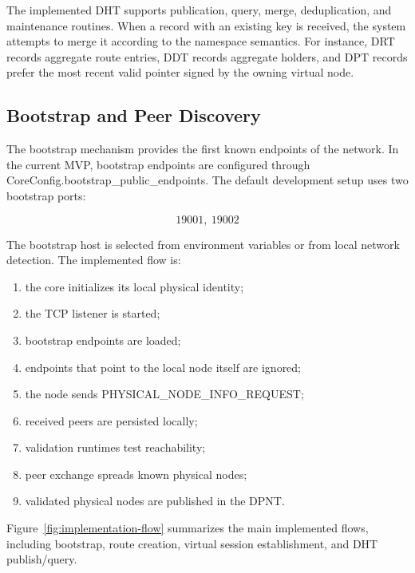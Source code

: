 \documentclass[12pt]{article}
\newcommand{\codebreak}[1]{{\footnotesize\ttfamily #1}}
\begin{document}
The implemented DHT supports publication, query, merge, deduplication, and maintenance routines. When a record with an existing key is received, the system attempts to merge it according to the namespace semantics. For instance, DRT records aggregate route entries, DDT records aggregate holders, and DPT records prefer the most recent valid pointer signed by the owning virtual node.

\subsection{Bootstrap and Peer Discovery}
\label{sec:bootstrap-peer-discovery}

The bootstrap mechanism provides the first known endpoints of the network. In the current MVP, bootstrap endpoints are configured through \codebreak{CoreConfig.bootstrap\_\allowbreak{}public\_\allowbreak{}endpoints}. The default development setup uses two bootstrap ports:

\begin{equation}
    19001,\ 19002
\end{equation}

The bootstrap host is selected from environment variables or from local network detection. The implemented flow is:

\begin{enumerate}
    \item the core initializes its local physical identity;
    \item the TCP listener is started;
    \item bootstrap endpoints are loaded;
    \item endpoints that point to the local node itself are ignored;
    \item the node sends \codebreak{PHYSICAL\_\allowbreak{}NODE\_\allowbreak{}INFO\_\allowbreak{}REQUEST};
    \item received peers are persisted locally;
    \item validation runtimes test reachability;
    \item peer exchange spreads known physical nodes;
    \item validated physical nodes are published in the DPNT.
\end{enumerate}

Figure~\ref{fig:implementation-flow} summarizes the main implemented flows, including bootstrap, route creation, virtual session establishment, and DHT publish/query.
\end{document}
